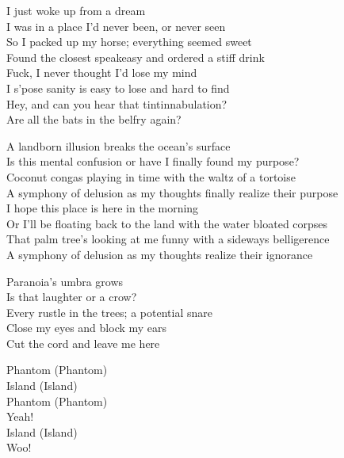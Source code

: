 



I just woke up from a dream\\
I was in a place I'd never been, or never seen\\
So I packed up my horse; everything seemed sweet\\
Found the closest speakeasy and ordered a stiff drink\\

Fuck, I never thought I'd lose my mind\\
I s'pose sanity is easy to lose and hard to find\\
Hey, and can you hear that tintinnabulation?\\
Are all the bats in the belfry again?\\


A landborn illusion breaks the ocean's surface\\
Is this mental confusion or have I finally found my purpose?\\
Coconut congas playing in time with the waltz of a tortoise\\
A symphony of delusion as my thoughts finally realize their purpose\\
I hope this place is here in the morning\\
Or I'll be floating back to the land with the water bloated corpses\\
That palm tree's looking at me funny with a sideways belligerence\\
A symphony of delusion as my thoughts realize their ignorance\\


Paranoia's umbra grows\\
Is that laughter or a crow?\\
Every rustle in the trees; a potential snare\\
Close my eyes and block my ears\\
Cut the cord and leave me here\\


Phantom (Phantom)\\
Island (Island)\\
Phantom (Phantom)\\
Yeah!\\
Island (Island)\\
Woo!\\

